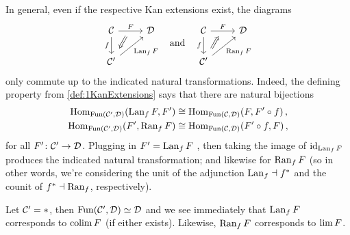 \begin{warn}\label{warn:KanDoesntExtend}
	In general, even if the respective Kan extensions exist, the diagrams
	\begin{equation*}
		\begin{tikzcd}
			\Cc\dar["f"']\rar["F",""{name=B,sloped}]& \Dd\arrow[from=B,to=2-1,draw=none,"\Longleftarrow"{sloped,marking,pos=0.5}]\\
			\Cc'\urar["\Lan_fF"']
		\end{tikzcd}
		\quad\text{and}\quad
		\begin{tikzcd}
			\Cc\dar["f"']\rar["F",""{name=B,sloped}]& \Dd\arrow[from=B,to=2-1,draw=none,"\Longrightarrow"{sloped,marking,pos=0.5}]\\
			\Cc'\urar["\Ran_fF"']
		\end{tikzcd}
	\end{equation*}
	only commute up to the indicated natural transformations. Indeed, the defining property from \cref{def:1KanExtensions} says that there are natural bijections
	\begin{align*}
		\operatorname{Hom}_{\operatorname{Fun}(\mathcal{C}',\mathcal{D})}(\operatorname{Lan}_fF,F')&\cong \operatorname{Hom}_{\operatorname{Fun}(\mathcal{C},\mathcal{D})}(F,F'\circ f)\,,\\
		\operatorname{Hom}_{\operatorname{Fun}(\mathcal{C}',\mathcal{D})}(F',\operatorname{Ran}_fF)&\cong \operatorname{Hom}_{\operatorname{Fun}(\mathcal{C},\mathcal{D})}(F'\circ f,F)\,,
	\end{align*}
	for all $F'\colon \mathcal{C}'\rightarrow \mathcal{D}$. Plugging in $F'=\operatorname{Lan}_fF$ , then taking the image of $\operatorname{id}_{\operatorname{Lan}_fF}$ produces the indicated natural transformation; and likewise for $\operatorname{Ran}_fF$ (so in other words, we're considering the unit of the adjunction $\operatorname{Lan}_f\dashv f^*$ and the counit of $f^*\dashv\operatorname{Ran}_f$, respectively).
\end{warn}
\begin{exm}\label{exm:1ColimitAsKanExtension}
	Let $\mathcal{C}'=*$, then $\operatorname{Fun}(\mathcal{C}',\mathcal{D})\simeq \mathcal{D}$ and we see immediately that $\operatorname{Lan}_fF$ corresponds to $\operatorname*{colim} F$ (if either exists). Likewise, $\operatorname{Ran}_fF$ corresponds to $\operatorname*{lim} F$.
\end{exm}
